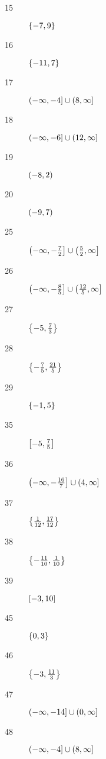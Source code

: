 \documentclass[letterpaper]{exam}
\begin{document}
\begin{description}
      \item[15] $ \cbr{ -7, 9 } $

      \item[16] $ \cbr{ -11, 7 } $

      \item[17] $ \intoc{ -\infty, -4 } \cup \intoc{ 8, \infty } $

      \item[18] $ \intoc{ -\infty, -6 } \cup \intoc{ 12, \infty } $

      \item[19] $ \intoo{ -8, 2 } $

      \item[20] $ \intoo{ -9, 7 } $

      \item[25] $ \intoc{ -\infty, - \frac{7}{2} } \cup \intoc{ \frac{5}{2}, \infty } $

      \item[26] $ \intoc{ -\infty, - \frac{8}{5} } \cup \intoc{ \frac{12}{5}, \infty } $

      \item[27] $ \cbr{ -5, \frac{7}{3} } $

      \item[28] $ \cbr{ - \frac{7}{5}, \frac{21}{5} } $

      \item[29] $ \cbr{ -1, 5 } $

      \item[35] $ \intcc{ -5, \frac{7}{5} } $

      \item[36] $ \intoc{ -\infty, - \frac{16}{7} } \cup \intoc{ 4, \infty } $

      \item[37] $ \cbr{ \frac{1}{12}, \frac{17}{12} } $

      \item[38] $ \cbr{ - \frac{11}{10}, \frac{1}{10} } $

      \item[39] $ \intcc{ -3, 10 } $

      \item[45] $ \cbr{ 0, 3 } $

      \item[46] $ \cbr{ -3, \frac{11}{3} } $

      \item[47] $ \intoc{ -\infty, -14 } \cup \intoc{ 0, \infty } $

      \item[48] $ \intoc{ -\infty, -4 } \cup \intoc{ 8, \infty } $


\end{description}
\end{document}

